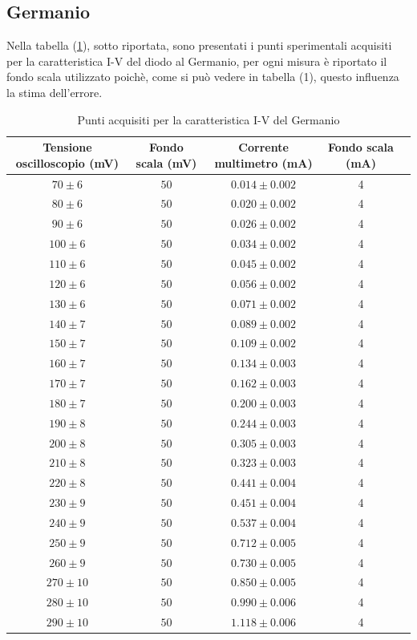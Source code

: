 \documentclass[]{article}
\begin{document}
\subsection{Germanio}
Nella tabella (\ref{tab:germanio}), sotto riportata, sono presentati i punti sperimentali acquisiti per la caratteristica I-V del diodo al Germanio, per ogni misura è riportato il fondo scala utilizzato poichè, come si può vedere in tabella (1), questo influenza la stima dell'errore.
	\begin{table}[H]
		\centering
	\begin{tabular}{|c|c|c|c|c|}
		\hline
		Tensione oscilloscopio (mV)& Fondo scala (mV) & Corrente multimetro (mA) &Fondo scala (mA)\\
		\hline
		$ 70\pm 6 $ &$ 50 $ & $ 0.014\pm 0.002 $ &4 \\
		\hline
		$ 80\pm 6$ &$ 50 $ & $ 0.020\pm 0.002 $&4 \\
		\hline
		$ 90\pm 6$ &$ 50 $ & $ 0.026\pm 0.002 $&4 \\
		\hline
		$ 100\pm 6 $ &$ 50 $ & $ 0.034\pm 0.002 $&4 \\
		\hline
		$110\pm 6 $ &$ 50 $ & $ 0.045\pm 0.002 $&4 \\
		\hline
		$ 120\pm 6 $ &$ 50 $ & $ 0.056\pm 0.002 $&4 \\
		\hline
		$ 130\pm 6$ &$ 50 $ & $ 0.071\pm 0.002 $&4 \\
		\hline
		$ 140\pm 7$ &$ 50 $ & $ 0.089\pm 0.002 $&4 \\
		\hline
		$ 150\pm 7$ &$ 50 $ & $ 0.109\pm 0.002 $&4 \\
		\hline
		$ 160\pm 7$ &$ 50 $ & $ 0.134\pm 0.003 $&4 \\
		\hline
		$ 170\pm 7$ &$ 50 $ & $ 0.162\pm 0.003 $&4 \\
		\hline
		$ 180\pm 7$ &$ 50 $ & $ 0.200\pm 0.003 $&4 \\
		\hline
		$ 190\pm 8$ &$ 50 $ & $ 0.244\pm 0.003 $&4 \\
		\hline
		$ 200\pm 8$ &$ 50 $ & $ 0.305\pm 0.003 $&4 \\
		\hline
		$ 210\pm 8$ &$ 50 $ & $ 0.323\pm 0.003 $&4 \\
		\hline
		$ 220\pm 8$ &$ 50 $ & $ 0.441\pm 0.004 $&4 \\
		\hline
		$ 230\pm 9$ &$ 50 $ & $ 0.451\pm 0.004 $&4 \\
		\hline
		$ 240\pm 9$ &$ 50 $ & $ 0.537\pm 0.004 $&4 \\
		\hline
		$ 250\pm 9$ &$ 50 $ & $ 0.712\pm 0.005 $&4 \\
		\hline
		$ 260\pm 9$ &$ 50 $ & $ 0.730\pm 0.005 $&4 \\
		\hline
		$ 270\pm 10$ &$ 50 $ & $ 0.850\pm 0.005 $&4 \\
		\hline
		$ 280\pm 10$ &$ 50 $ & $ 0.990\pm 0.006 $&4 \\
		\hline
		$ 290\pm 10$ &$ 50 $ & $ 1.118\pm 0.006 $&4 \\
		\hline
	\end{tabular}
\caption{Punti acquisiti per la caratteristica I-V del Germanio}
\label{tab:germanio}
\end{table}
\end{document}
